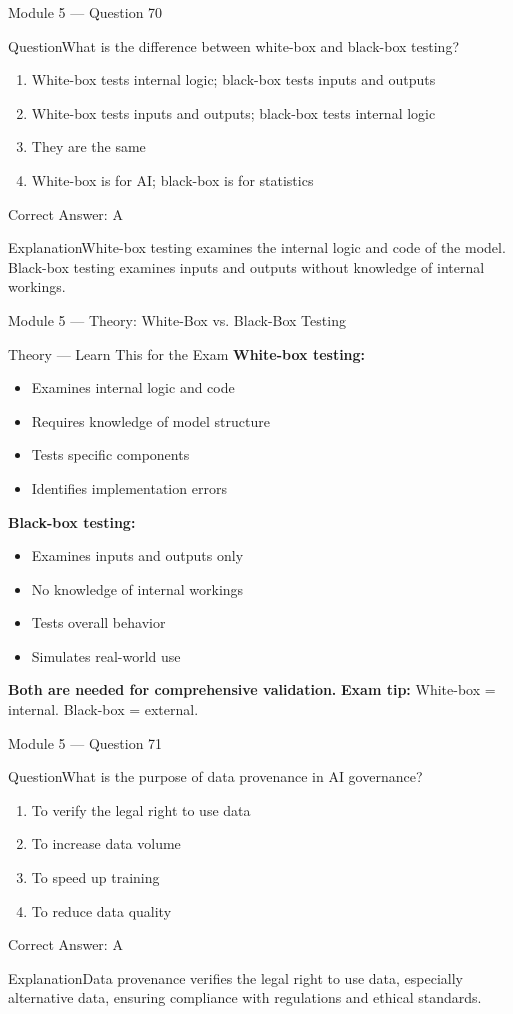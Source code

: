 \documentclass[aspectratio=169,10pt]{beamer}
\newcommand{\question}[1]{\begin{block}{Question}#1\end{block}}
\newcommand{\options}[4]{%
	\begin{enumerate}[label=\Alph*.,leftmargin=*]
		\item #1
		\item #2
		\item #3
		\item #4
	\end{enumerate}
}
\newcommand{\answerbox}[1]{\begin{exampleblock}{Correct Answer: #1}\end{exampleblock}}
\newcommand{\explain}[1]{\begin{block}{Explanation}#1\end{block}}
\newcommand{\theory}[1]{%
	\begin{block}{Theory --- Learn This for the Exam}
		\small #1
	\end{block}
}
\begin{document}
	\begin{frame}{Module 5 --- Question 70}
		\question{What is the difference between white-box and black-box testing?}
		\options{White-box tests internal logic; black-box tests inputs and outputs}{White-box tests inputs and outputs; black-box tests internal logic}{They are the same}{White-box is for AI; black-box is for statistics}
		\answerbox{A}
		\explain{White-box testing examines the internal logic and code of the model. Black-box testing examines inputs and outputs without knowledge of internal workings.}
	\end{frame}
	
	\begin{frame}{Module 5 --- Theory: White-Box vs. Black-Box Testing}
		\theory{
			\textbf{White-box testing:}
			\begin{itemize}
				\item Examines internal logic and code
				\item Requires knowledge of model structure
				\item Tests specific components
				\item Identifies implementation errors
			\end{itemize}
			\textbf{Black-box testing:}
			\begin{itemize}
				\item Examines inputs and outputs only
				\item No knowledge of internal workings
				\item Tests overall behavior
				\item Simulates real-world use
			\end{itemize}
			\textbf{Both are needed for comprehensive validation.}
			\textbf{Exam tip:} White-box = internal. Black-box = external.
		}
	\end{frame}
	
	\begin{frame}{Module 5 --- Question 71}
		\question{What is the purpose of data provenance in AI governance?}
		\options{To verify the legal right to use data}{To increase data volume}{To speed up training}{To reduce data quality}
		\answerbox{A}
		\explain{Data provenance verifies the legal right to use data, especially alternative data, ensuring compliance with regulations and ethical standards.}
	\end{frame}
	
\end{document}
